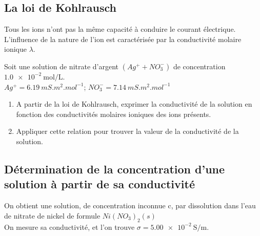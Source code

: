 \subsection{La loi de Kohlrausch}
Tous les ions n'ont pas la même capacité à conduire le courant électrique. \\
L'influence de la nature de l'ion est caractérisée par la conductivité molaire ionique $\lambda$. %


Soit une solution de nitrate d'argent $(Ag^+ + NO_3^-)$ de concentration $\SI{1,0e-2}{\mole\per\liter}$.\\
$Ag^+ = \SI{6,19}{mS.m^2.mol^{-1}} $;
$NO_3^-= \SI{7,14}{mS.m^2.mol^{-1}}$
\begin{enumerate}
\item A partir de la loi de Kohlrausch,  exprimer la conductivité de la solution en fonction des conductivités molaires ioniques des ions présents.
\item Appliquer cette relation pour trouver la valeur de la conductivité de la solution.
\end{enumerate}
\vspace{8cm}

\subsection{Détermination de la concentration d'une solution à partir de sa conductivité}
On obtient une solution, de concentration inconnue c, par dissolution dans l'eau de nitrate de nickel de formule $Ni(NO_3)_2(s)$\\
 On mesure sa conductivité, et l'on trouve $\sigma=\SI{5,00e-2}{\siemens\per\meter}$.\\
 
